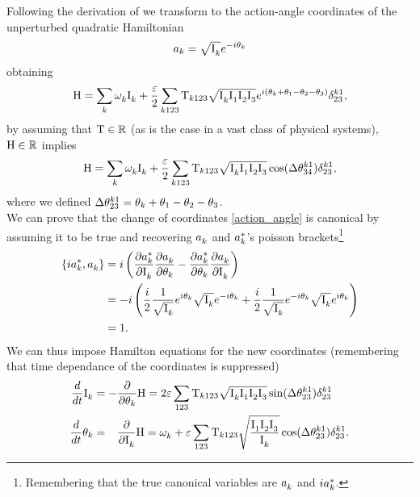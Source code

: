Following the derivation of \cite{Onorato2020} we transform to the action-angle coordinates of the unperturbed quadratic Hamiltonian
\begin{equation}
    a_k = \sqrt{\mathrm{I}^{}_k}e^{-i\theta_k}
    \label{action_angle}
\end{equation} 
obtaining 
\begin{equation}
    \mathrm{H} = \sum_k \omega^{}_k \mathrm{I}^{}_k + \frac{\varepsilon}{2} \sum_{k123}\mathrm{T}_{k123}\sqrt{\mathrm{I}^{}_k\mathrm{I}^{}_1\mathrm{I}^{}_2\mathrm{I}^{}_3}e^{i(\theta_k + \theta_1 - \theta_2 - \theta_3)}\delta^{k1}_{23},
\end{equation}
by assuming that $\mathrm{T} \in \mathbb{R}$ (as is the case in a vast class of physical systems), $\mathrm{H} \in \mathbb{R}$ implies 
\begin{equation}
    \mathrm{H} = \sum_k \omega^{}_k \mathrm{I}^{}_k + \frac{\varepsilon}{2} \sum_{k123}\mathrm{T}_{k123}\sqrt{\mathrm{I}^{}_k\mathrm{I}^{}_1\mathrm{I}^{}_2\mathrm{I}^{}_3}\cos(\Delta\theta^{k1}_{34})\delta^{k1}_{23},
\end{equation}
where we defined $\Delta\theta^{k1}_{23}=\theta_k + \theta_1 - \theta_2 - \theta_3$. \\
We can prove that the change of coordinates \eqref{action_angle} is canonical by assuming it to be true and recovering $a_k^{}$ and $a_k^{*}$'s poisson 
brackets\footnote{Remembering that the true canonical variables are $a_k^{}$ and $ia_k^{*}$.} 
\begin{align}
    \left\{ ia_k^{*}, a_k^{} \right\} &= i \left( \frac{\partial a_k^{*}}{\partial \mathrm{I}^{}_k}\frac{\partial a_k^{}}{\partial \theta_k}  -
    \frac{\partial a_k^{*}}{\partial \theta_k}\frac{\partial a_k^{}}{\partial \mathrm{I}^{}_k}  \right) \\
    &= - i \left( \frac{i}{2} \frac{1}{\sqrt{\mathrm{I}^{}_k}}e^{i\theta_k}\sqrt{\mathrm{I}^{}_k}e^{-i\theta_k} + 
    \frac{i}{2} \frac{1}{\sqrt{\mathrm{I}^{}_k}}e^{-i\theta_k}\sqrt{\mathrm{I}^{}_k}e^{i\theta_k}\right) \\
    &= 1 .
\end{align} 
We can thus impose Hamilton equations for the new coordinates (remembering that time dependance of the coordinates is suppressed)
\begin{align}
    \frac{d}{dt}\mathrm{I}^{}_k &= - \frac{\partial }{\partial \theta_k}\mathrm{H} = 2 \varepsilon \sum_{123} \mathrm{T}_{k123} \sqrt{\mathrm{I}^{}_k\mathrm{I}^{}_1\mathrm{I}^{}_2\mathrm{I}^{}_3} \sin(\Delta\theta^{k1}_{23})\delta^{k1}_{23}
    \label{Hameq1}\\
    \frac{d}{dt}\theta_k &= \phantom{-} \frac{\partial }{\partial \mathrm{I}^{}_k}\mathrm{H} = \omega^{}_k + 
    \varepsilon \sum_{123} \mathrm{T}_{k123} \sqrt{\frac{\mathrm{I}^{}_1\mathrm{I}^{}_2\mathrm{I}^{}_3}{\mathrm{I}^{}_k}}\cos(\Delta\theta^{k1}_{23})\delta^{k1}_{23}.
    \label{Hameq2}
\end{align}
